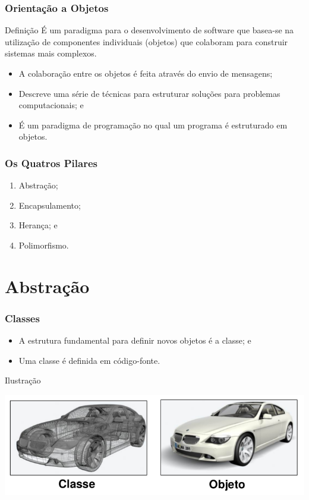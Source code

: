 \documentclass{beamer}
\begin{document}
\begin{frame}
	\frametitle{Orientação a Objetos}

	\begin{block}{Definição}
		É um paradigma para o desenvolvimento de software que basea-se na utilização de componentes individuais (objetos) que colaboram para construir sistemas mais complexos. 
	\end{block}\vfill
	
	\begin{itemize}
	  \item A colaboração entre os objetos é feita através do envio de mensagens;
	  \item Descreve uma série de técnicas para estruturar soluções para problemas
	  computacionais; e
	  \item É um paradigma de programação no qual um programa é estruturado em
	  objetos.
	\end{itemize}
\end{frame}

\begin{frame}
	\frametitle{Os Quatros Pilares}
	
	\begin{enumerate}
	   \item Abstração;
	   \item Encapsulamento;
	   \item Herança; e
	  \item Polimorfismo.
	\end{enumerate}
\end{frame}

\section{Abstração}

\begin{frame}
	\frametitle{Classes}
	
	\begin{itemize}
	  \item A estrutura fundamental para definir novos objetos é a classe; e
	  \item Uma classe é definida em código-fonte.
	\end{itemize} \vfill
	
	\begin{exampleblock}{Ilustração}
		\begin{center}
			\includegraphics[scale=0.3]{./imagens/classe-objeto}
		\end{center}		
	\end{exampleblock}
\end{frame}
\end{document}
